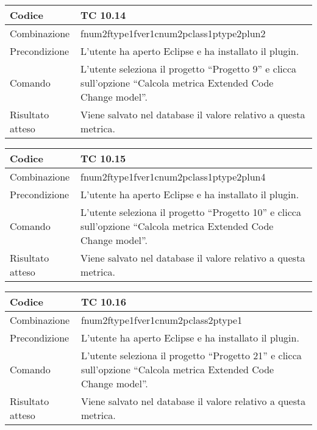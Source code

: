 \begin{table}[ht]
\begin{tabular}{|p{3cm}|p{9cm}|}
\hline
\cellcolor{lightgray}Codice				& TC 10.14								\\
\hline
\cellcolor{lightgray}Combinazione		& fnum2ftype1fver1cnum2pclass1ptype2plun2									\\
\hline
\cellcolor{lightgray}Precondizione		& L'utente ha aperto Eclipse e ha installato il plugin.		\\
\hline
\cellcolor{lightgray}Comando			& L'utente seleziona il progetto ``Progetto 9''  e clicca sull'opzione ``Calcola metrica Extended Code Change model''.	\\
\hline
\cellcolor{lightgray}Risultato atteso	& Viene salvato nel database il valore relativo a questa metrica.\\
\hline
\end{tabular}
\end{table}

\begin{table}[ht]
\begin{tabular}{|p{3cm}|p{9cm}|}
\hline
\cellcolor{lightgray}Codice				& TC 10.15								\\
\hline
\cellcolor{lightgray}Combinazione		& fnum2ftype1fver1cnum2pclass1ptype2plun4									\\
\hline
\cellcolor{lightgray}Precondizione		& L'utente ha aperto Eclipse e ha installato il plugin.		\\
\hline
\cellcolor{lightgray}Comando			& L'utente seleziona il progetto ``Progetto 10''  e clicca sull'opzione ``Calcola metrica Extended Code Change model''.	\\
\hline
\cellcolor{lightgray}Risultato atteso	& Viene salvato nel database il valore relativo a questa metrica.\\
\hline
\end{tabular}
\end{table}

\begin{table}[ht]
\begin{tabular}{|p{3cm}|p{9cm}|}
\hline
\cellcolor{lightgray}Codice				& TC 10.16								\\
\hline
\cellcolor{lightgray}Combinazione		& fnum2ftype1fver1cnum2pclass2ptype1									\\
\hline
\cellcolor{lightgray}Precondizione		& L'utente ha aperto Eclipse e ha installato il plugin.		\\
\hline
\cellcolor{lightgray}Comando			& L'utente seleziona il progetto ``Progetto 21''  e clicca sull'opzione ``Calcola metrica Extended Code Change model''.	\\
\hline
\cellcolor{lightgray}Risultato atteso	& Viene salvato nel database il valore relativo a questa metrica.\\
\hline
\end{tabular}
\end{table}

